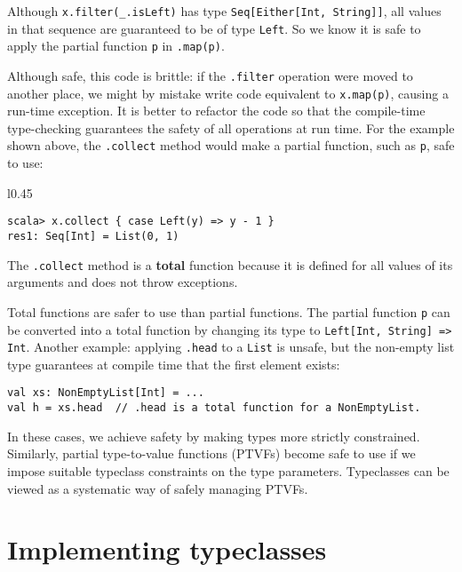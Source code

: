 \noindent Although \lstinline!x.filter(_.isLeft)! has type \lstinline!Seq[Either[Int, String]]!,
all values in that sequence are guaranteed to be of type \lstinline!Left!.
So we know it is safe to apply the partial function \lstinline!p!
in \lstinline!.map(p)!. 

Although safe, this code is brittle: if the \lstinline!.filter! operation
were moved to another place, we might by mistake write code equivalent
to \lstinline!x.map(p)!, causing a run-time exception. It is better
to refactor the code so that the compile-time type-checking guarantees
the safety of all operations at run time. For the example shown above,
the \lstinline!.collect! method would make a partial function, such
as \lstinline!p!, safe to use:

\begin{wrapfigure}{l}{0.45\columnwidth}%
\vspace{-0.75\baselineskip}
\begin{lstlisting}
scala> x.collect { case Left(y) => y - 1 }
res1: Seq[Int] = List(0, 1)
\end{lstlisting}

\vspace{-0.75\baselineskip}
\end{wrapfigure}%

\noindent The \lstinline!.collect! method is a \textbf{total}
function because it is defined for all values of its arguments and
does not throw exceptions. 

Total functions are safer to use than partial functions. The partial
function \lstinline!p! can be converted into a total function by
changing its type to \lstinline!Left[Int, String] => Int!. Another
example: applying \lstinline!.head! to a \lstinline!List! is unsafe,
but the non-empty list type guarantees at compile time that the first
element exists:
\begin{lstlisting}
val xs: NonEmptyList[Int] = ...
val h = xs.head  // .head is a total function for a NonEmptyList.
\end{lstlisting}
In these cases, we achieve safety by making types more strictly constrained.
Similarly, partial type-to-value functions (PTVFs) become safe to
use if we impose suitable typeclass constraints on the type parameters.
Typeclasses can be viewed as a systematic way of safely managing PTVFs.

\section{Implementing typeclasses}

